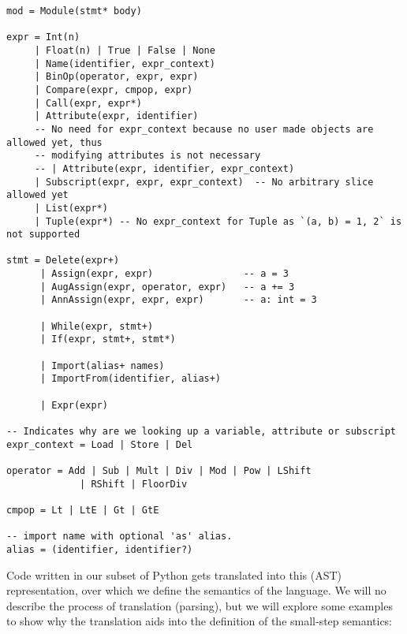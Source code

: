 \begin{verbatim}
mod = Module(stmt* body)

expr = Int(n)
     | Float(n) | True | False | None
     | Name(identifier, expr_context)
     | BinOp(operator, expr, expr)
     | Compare(expr, cmpop, expr)
     | Call(expr, expr*)
     | Attribute(expr, identifier)
     -- No need for expr_context because no user made objects are allowed yet, thus
     -- modifying attributes is not necessary
     -- | Attribute(expr, identifier, expr_context)
     | Subscript(expr, expr, expr_context)  -- No arbitrary slice allowed yet
     | List(expr*)
     | Tuple(expr*) -- No expr_context for Tuple as `(a, b) = 1, 2` is not supported

stmt = Delete(expr+)
      | Assign(expr, expr)                -- a = 3
      | AugAssign(expr, operator, expr)   -- a += 3
      | AnnAssign(expr, expr, expr)       -- a: int = 3

      | While(expr, stmt+)
      | If(expr, stmt+, stmt*)

      | Import(alias+ names)
      | ImportFrom(identifier, alias+)

      | Expr(expr)

-- Indicates why are we looking up a variable, attribute or subscript
expr_context = Load | Store | Del

operator = Add | Sub | Mult | Div | Mod | Pow | LShift
             | RShift | FloorDiv

cmpop = Lt | LtE | Gt | GtE

-- import name with optional 'as' alias.
alias = (identifier, identifier?)
\end{verbatim}

Code written in our subset of Python gets translated into this (AST) representation, over
which we define the semantics of the language. We will no describe the process of
translation (parsing), but we will explore some examples to show why the translation aids
into the definition of the small-step semantics:

